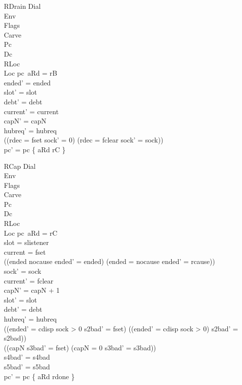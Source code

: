 \documentclass[a4paper,10pt,fleqn]{article}
\begin{document}
\begin{schema}{RDrain}
  \Delta Dial \\ \Xi Env \\ \Xi Flags \\ \Xi Carve \\ \Delta Pc \\ \Xi Dc \\
  \Xi RLoc \\ \Xi Loc
\where
  pc~aRd = rB \\
  ended' = ended \\
  slot' = slot \\
  debt' = debt \\
  current' = current \\
  capN' = capN \\
  hubreq' = hubreq \\
  ((rdec = fset \land sock' = 0) \lor (rdec = fclear \land sock' = sock)) \\
  pc' = pc \oplus \{ aRd \mapsto rC \}
\end{schema}

\begin{schema}{RCap}
  \Delta Dial \\ \Xi Env \\ \Delta Flags \\ \Xi Carve \\ \Delta Pc \\ \Xi Dc \\
  \Xi RLoc \\ \Xi Loc
\where
  pc~aRd = rC \\
  slot = slistener \\
  current = fset \\
  ((ended \neq nocause \land ended' = ended) \lor
    (ended = nocause \land ended' = rcause)) \\
  sock' = sock \\
  current' = fclear \\
  capN' = capN + 1 \\
  slot' = slot \\
  debt' = debt \\
  hubreq' = hubreq \\
  ((ended' = cdisp \land sock > 0 \land s2bad' = fset) \lor
    (\lnot (ended' = cdisp \land sock > 0) \land s2bad' = s2bad)) \\
  ((capN  \land s3bad' = fset) \lor (capN = 0 \land s3bad' = s3bad)) \\
  s4bad' = s4bad \\
  s5bad' = s5bad \\
  pc' = pc \oplus \{ aRd \mapsto rdone \}
\end{schema}
\end{document}
